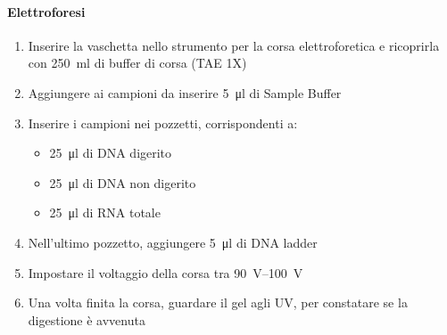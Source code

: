 \paragraph{Elettroforesi}
\begin{enumerate}
	\item Inserire la vaschetta nello strumento per la corsa elettroforetica e ricoprirla con \qty{250}{\ml} di buffer di corsa (TAE 1X) 
	\item Aggiungere ai campioni da inserire \qty{5}{\micro\litre} di \foreignlanguage{english}{Sample Buffer}
	\item Inserire i campioni nei pozzetti, corrispondenti a:
	\begin{itemize}
		\item \qty{25}{\micro\litre} di DNA digerito
		\item \qty{25}{\micro\litre} di DNA non digerito
		\item \qty{25}{\micro\litre} di RNA totale
	\end{itemize}
	\item Nell'ultimo pozzetto, aggiungere \qty{5}{\micro\litre} di DNA \foreignlanguage{english}{ladder}
	\item Impostare il voltaggio della corsa tra \qtyrange{90}{100}{\volt}
	\item Una volta finita la corsa, guardare il gel agli UV, per constatare se la digestione è avvenuta
\end{enumerate}






\begingroup
	\newpage
\endgroup
